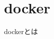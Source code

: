 \documentclass[../../../main]{subfiles}
\begin{document}
    \section{docker}\label{sec:phraseology-docker}

    dockerとは
\end{document}
